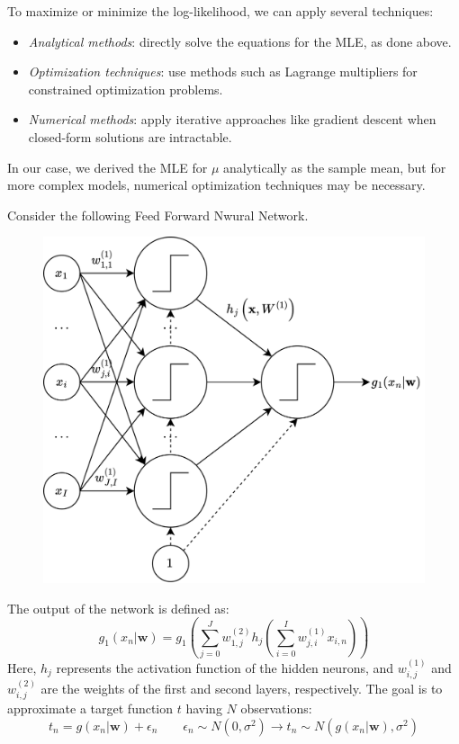 To maximize or minimize the log-likelihood, we can apply several techniques:
\begin{itemize}
    \item \textit{Analytical methods}: directly solve the equations for the MLE, as done above.
    \item \textit{Optimization techniques}: use methods such as Lagrange multipliers for constrained optimization problems.
    \item \textit{Numerical methods}: apply iterative approaches like gradient descent when closed-form solutions are intractable.
\end{itemize}
In our case, we derived the MLE for $\mu$ analytically as the sample mean, but for more complex models, numerical optimization techniques may be necessary.
\begin{example}
    Consider the following Feed Forward Nwural Network. 
    \begin{figure}[H]
        \centering
        \includegraphics[width=0.7\linewidth]{images/ffnn1.png}
    \end{figure}
    The output of the network is defined as:
    \[g_1(x_n|\mathbf{w})=g_1\left(\sum_{j=0}^Jw_{1,j}^{(2)}h_j\left(\sum_{i=0}^Iw_{j,i}^{(1)}x_{i,n}\right)\right)\]
    Here, $h_j$ represents the activation function of the hidden neurons, and $w_{i,j}^{(1)}$ and $w_{i,j}^{(2)}$ are the weights of the first and second layers, respectively.
    The goal is to approximate a target function $t$ having $N$ observations: 
    \[t_n=g(x_n|\mathbf{w})+\epsilon_n \qquad \epsilon_n\sim N(0,\sigma^2)\rightarrow t_n\sim N(g(x_n|\mathbf{w}),\sigma^2)\]


\end{example}
